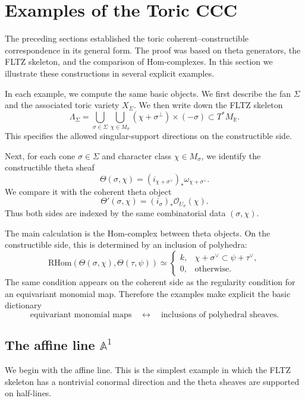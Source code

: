 \section{Examples of the Toric CCC}
The preceding sections established the toric coherent--constructible correspondence in its general form. The proof was based on theta generators, the FLTZ skeleton, and the comparison of Hom-complexes. In this section we illustrate these constructions in several explicit examples.

In each example, we compute the same basic objects. We first describe the fan \(\Sigma\) and the associated toric variety \(X_\Sigma\). We then write down the FLTZ skeleton
\[
\Lambda_\Sigma
=
\bigcup_{\sigma\in\Sigma}
\bigcup_{\chi\in M_\sigma}
(\chi+\sigma^\perp)\times(-\sigma)
\subset T^*M_{\mathbb R}.
\]
This specifies the allowed singular-support directions on the constructible side.

Next, for each cone \(\sigma\in\Sigma\) and character class \(\chi\in M_\sigma\), we identify the constructible theta sheaf
\[
\Theta(\sigma,\chi)
=
(i_{\chi+\sigma^\vee})_*\omega_{\chi+\sigma^\vee}.
\]
We compare it with the coherent theta object
\[
\Theta'(\sigma,\chi)
=
(i_\sigma)_*\mathcal O_{U_\sigma}(\chi).
\]
Thus both sides are indexed by the same combinatorial data \((\sigma,\chi)\).

The main calculation is the Hom-complex between theta objects. On the constructible side, this is determined by an inclusion of polyhedra:
\[
\mathrm{RHom}(\Theta(\sigma,\chi),\Theta(\tau,\psi))
\simeq
\begin{cases}
k, & \chi+\sigma^\vee\subset \psi+\tau^\vee,\\
0, & \text{otherwise}.
\end{cases}
\]
The same condition appears on the coherent side as the regularity condition for an equivariant monomial map. Therefore the examples make explicit the basic dictionary
\[
\text{equivariant monomial maps}
\quad\longleftrightarrow\quad
\text{inclusions of polyhedral sheaves}.
\]

\subsection{The affine line \texorpdfstring{$\mathbb A^1$}{A1}}

We begin with the affine line. This is the simplest example in which the FLTZ skeleton has a nontrivial conormal direction and the theta sheaves are supported on half-lines.

